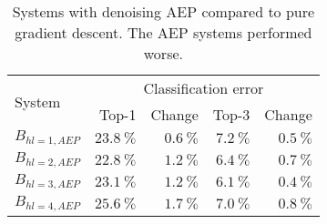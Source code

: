 \begin{table}[tb]
    \centering
    \begin{tabular}{lrrrr}
    \toprule
    \multirow{2}{*}{System}  & \multicolumn{4}{c}{Classification error}\\
    \cmidrule(l){2-5}
                 & Top-1                  & Change               & Top-3                & Change                 \\\midrule
    $B_{hl=1,AEP}$ & $\SI{23.8}{\percent}$ & $\SI{+0.6}{\percent}$ & $\SI{7.2}{\percent}$ & $\SI{+0.5}{\percent}$\\
    $B_{hl=2,AEP}$ & \underline{$\SI{22.8}{\percent}$} & $\SI{+1.2}{\percent}$ & $\SI{6.4}{\percent}$ & $\SI{+0.7}{\percent}$\\
    $B_{hl=3,AEP}$ & $\SI{23.1}{\percent}$ & $\SI{+1.2}{\percent}$ & \underline{$\SI{6.1}{\percent}$} & $\SI{+0.4}{\percent}$\\
    $B_{hl=4,AEP}$ & $\SI{25.6}{\percent}$ & $\SI{+1.7}{\percent}$ & $\SI{7.0}{\percent}$ & $\SI{+0.8}{\percent}$\\
    \bottomrule
    \end{tabular}
    \caption{Systems with denoising \acrfull{AEP} compared to pure
             gradient descent. The \gls{AEP} systems performed worse.}
\label{table:pretraining-denoising-auto-encoder}
\end{table}
